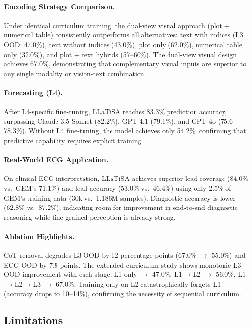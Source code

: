 \documentclass[11pt]{article}
\begin{document}
\paragraph{Encoding Strategy Comparison.}
Under identical curriculum training, the dual-view visual approach (plot + numerical table) consistently outperforms all alternatives: text with indices (L3 OOD: 47.0\%), text without indices (43.0\%), plot only (62.0\%), numerical table only (32.0\%), and plot + text hybrids (57--60\%). The dual-view visual design achieves 67.0\%, demonstrating that complementary visual inputs are superior to any single modality or vision-text combination.

\paragraph{Forecasting (L4).}
After L4-specific fine-tuning, LLaTiSA reaches 83.3\% prediction accuracy, surpassing Claude-3.5-Sonnet (82.2\%), GPT-4.1 (79.1\%), and GPT-4o (75.6--78.3\%). Without L4 fine-tuning, the model achieves only 54.2\%, confirming that predictive capability requires explicit training.

\paragraph{Real-World ECG Application.}
On clinical ECG interpretation, LLaTiSA achieves superior lead coverage (84.0\% vs.\ GEM's 71.1\%) and lead accuracy (53.0\% vs.\ 46.4\%) using only 2.5\% of GEM's training data (30k vs.\ 1.186M samples). Diagnostic accuracy is lower (62.8\% vs.\ 87.2\%), indicating room for improvement in end-to-end diagnostic reasoning while fine-grained perception is already strong.

\paragraph{Ablation Highlights.}
CoT removal degrades L3 OOD by 12 percentage points (67.0\% $\to$ 55.0\%) and ECG OOD by 7.9 points. The extended curriculum study shows monotonic L3 OOD improvement with each stage: L1-only $\to$ 47.0\%, L1$\to$L2 $\to$ 56.0\%, L1$\to$L2$\to$L3 $\to$ 67.0\%. Training only on L2 catastrophically forgets L1 (accuracy drops to 10--14\%), confirming the necessity of sequential curriculum.

\subsection{Limitations}
\end{document}
